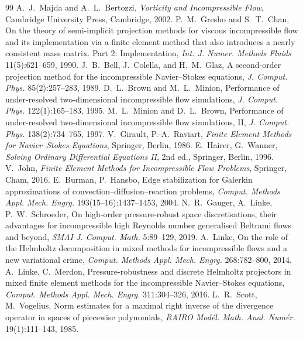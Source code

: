 \documentclass[11pt]{article}
\theoremstyle{remark}\newtheorem{remark}{Remark}
\theoremstyle{plain}
\newcommand{\new}[1]{{\color{blue}#1}}
\begin{document}
\begin{thebibliography}{99}
 A.~J.~Majda and A.~L.~Bertozzi, \emph{Vorticity and Incompressible Flow}, Cambridge University Press, Cambridge, 2002.
 P.~M.~Gresho and S.~T.~Chan, On the theory of semi-implicit projection methods for viscous incompressible flow and its implementation via a finite element method that also introduces a nearly consistent mass matrix. Part 2: Implementation, \emph{Int. J. Numer. Methods Fluids} 11(5):621--659, 1990.
 J.~B.~Bell, J.~Colella, and H.~M.~Glaz, A second-order projection method for the incompressible Navier--Stokes equations, \emph{J. Comput. Phys.} 85(2):257--283, 1989.
 D.~L.~Brown and M.~L.~Minion, Performance of under-resolved two-dimensional incompressible flow simulations, \emph{J. Comput. Phys.} 122(1):165--183, 1995.
 M.~L.~Minion and D.~L.~Brown, Performance of under-resolved two-dimensional incompressible flow simulations, II, \emph{J. Comput. Phys.} 138(2):734--765, 1997.
\new{ V.~Girault, P.-A.~Raviart, \emph{Finite Element Methods for Navier--Stokes Equations}, Springer, Berlin, 1986.}
\new{ E.~Hairer, G.~Wanner, \emph{Solving Ordinary Differential Equations II}, 2nd ed., Springer, Berlin, 1996.}
\new{ V.~John, \emph{Finite Element Methods for Incompressible Flow Problems}, Springer, Cham, 2016.}
\new{ E.~Burman, P.~Hansbo, Edge stabilization for Galerkin approximations of convection--diffusion--reaction problems, \emph{Comput. Methods Appl. Mech. Engrg.} 193(15--16):1437--1453, 2004.}
\new{ N.~R.~Gauger, A.~Linke, P.~W.~Schroeder, On high-order pressure-robust space discretisations, their advantages for incompressible high Reynolds number generalised Beltrami flows and beyond, \emph{SMAI J. Comput. Math.} 5:89--129, 2019.}
\new{ A.~Linke, On the role of the Helmholtz decomposition in mixed methods for incompressible flows and a new variational crime, \emph{Comput. Methods Appl. Mech. Engrg.} 268:782--800, 2014.}
\new{ A.~Linke, C.~Merdon, Pressure-robustness and discrete Helmholtz projectors in mixed finite element methods for the incompressible Navier--Stokes equations, \emph{Comput. Methods Appl. Mech. Engrg.} 311:304--326, 2016.}
\new{ L.~R.~Scott, M.~Vogelius, Norm estimates for a maximal right inverse of the divergence operator in spaces of piecewise polynomials, \emph{RAIRO Mod\'el. Math. Anal. Num\'er.} 19(1):111--143, 1985.}
\end{thebibliography}
\end{document}
